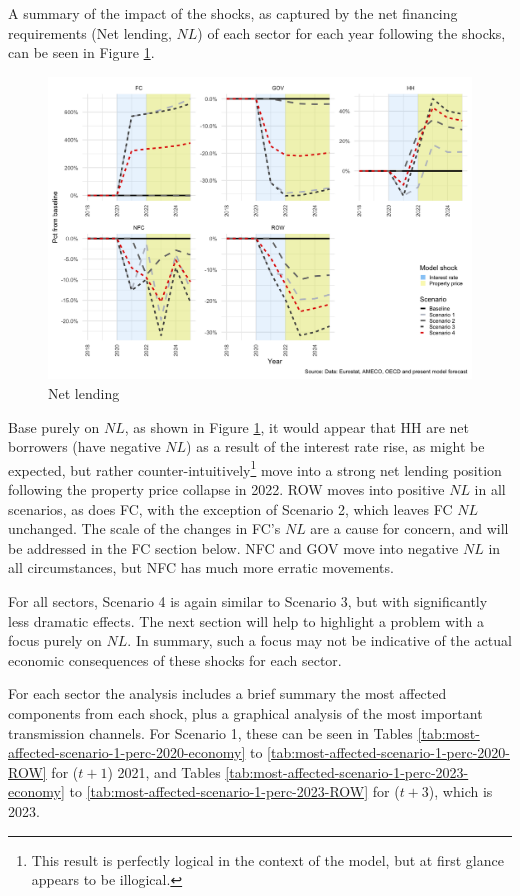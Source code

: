 \documentclass[
]{book}
\begin{document}
A summary of the impact of the shocks, as captured by the net financing requirements (Net lending, \(NL\)) of each sector for each year following the shocks, can be seen in Figure \ref{fig:fl-fi-sfc-plot-nl-S1-S4}.

\begin{figure}[H]
\includegraphics[width=0.95\linewidth]{figures/fl-fi-sfc-plot-nl-S1-S4-1} \caption{Net lending}\label{fig:fl-fi-sfc-plot-nl-S1-S4}
\end{figure}

Base purely on \(NL\), as shown in Figure \ref{fig:fl-fi-sfc-plot-nl-S1-S4}, it would appear that HH are net borrowers (have negative \(NL\)) as a result of the interest rate rise, as might be expected, but rather counter-intuitively\footnote{This result is perfectly logical in the context of the model, but at first glance appears to be illogical.} move into a strong net lending position following the property price collapse in 2022. ROW moves into positive \(NL\) in all scenarios, as does FC, with the exception of Scenario 2, which leaves FC \(NL\) unchanged. The scale of the changes in FC's \(NL\) are a cause for concern, and will be addressed in the FC section below. NFC and GOV move into negative \(NL\) in all circumstances, but NFC has much more erratic movements.

For all sectors, Scenario 4 is again similar to Scenario 3, but with significantly less dramatic effects. The next section will help to highlight a problem with a focus purely on \(NL\). In summary, such a focus may not be indicative of the actual economic consequences of these shocks for each sector.

For each sector the analysis includes a brief summary the most affected components from each shock, plus a graphical analysis of the most important transmission channels. For Scenario 1, these can be seen in Tables \ref{tab:most-affected-scenario-1-perc-2020-economy} to \ref{tab:most-affected-scenario-1-perc-2020-ROW} for (\(t + 1\)) 2021, and Tables \ref{tab:most-affected-scenario-1-perc-2023-economy} to \ref{tab:most-affected-scenario-1-perc-2023-ROW} for (\(t+3\)), which is 2023.
\end{document}
